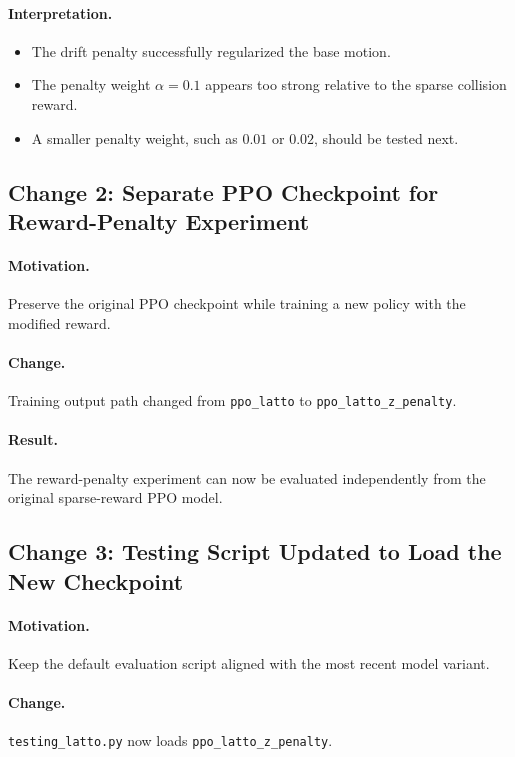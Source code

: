 \documentclass[11pt]{article}
\begin{document}
\paragraph{Interpretation.}
\begin{itemize}[leftmargin=1.5em]
  \item The drift penalty successfully regularized the base motion.
  \item The penalty weight $\alpha = 0.1$ appears too strong relative to the sparse collision reward.
  \item A smaller penalty weight, such as $0.01$ or $0.02$, should be tested next.
\end{itemize}

\subsection*{Change 2: Separate PPO Checkpoint for Reward-Penalty Experiment}

\paragraph{Motivation.}
Preserve the original PPO checkpoint while training a new policy with the modified reward.

\paragraph{Change.}
Training output path changed from \texttt{ppo\_latto} to \texttt{ppo\_latto\_z\_penalty}.

\paragraph{Result.}
The reward-penalty experiment can now be evaluated independently from the original sparse-reward PPO model.

\subsection*{Change 3: Testing Script Updated to Load the New Checkpoint}

\paragraph{Motivation.}
Keep the default evaluation script aligned with the most recent model variant.

\paragraph{Change.}
\texttt{testing\_latto.py} now loads \texttt{ppo\_latto\_z\_penalty}.
\end{document}
